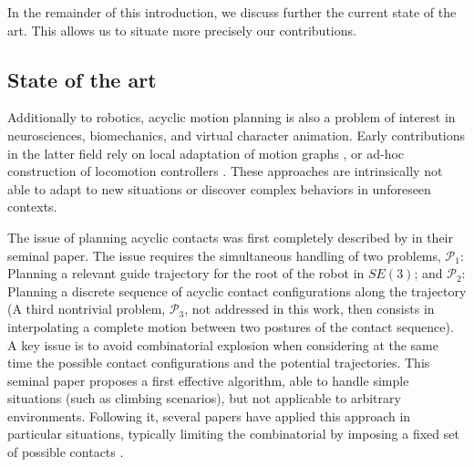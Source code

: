 In the remainder of this introduction, we discuss further the current state of the art. This allows us to situate more precisely our contributions.

\subsection{State of the art}

\newcommand{\Pa}{$\mathcal{P}_1$ }
\newcommand{\Pb}{$\mathcal{P}_2$ }

Additionally to robotics, acyclic motion planning is also a problem of interest in neurosciences, biomechanics, and virtual character animation.
Early contributions in the latter field rely on local adaptation of motion graphs \citep{citeulike:220163}, or ad-hoc construction of locomotion controllers \citep{Pettre:2003:LPD:846276.846313}. These approaches are intrinsically not able to adapt to new situations or discover complex behaviors in unforeseen contexts.

The issue of planning acyclic contacts was first completely described by \citeauthor{conf/iser/BretlRLKA04} in their seminal paper. The issue requires the simultaneous handling of two problems, $\mathcal{P}_1$: Planning a relevant guide trajectory for the root of the robot in $SE(3)$; and $\mathcal{P}_2$: Planning a discrete sequence of acyclic contact configurations along the trajectory (A third nontrivial problem, $\mathcal{P}_3$, not addressed in this work, then consists in interpolating a complete motion between two postures of the contact sequence).  A key issue is to avoid combinatorial explosion when considering at the same time the possible contact configurations and the potential trajectories. This seminal paper proposes a first effective algorithm, able to handle simple situations (such as climbing scenarios), but not applicable to arbitrary environments. Following it, seve\-ral papers have applied this approach in particular situations, typically limiting the combinatorial by imposing a fixed set of possible contacts \citep{Hauser06usingmotion, stilman2010}.

